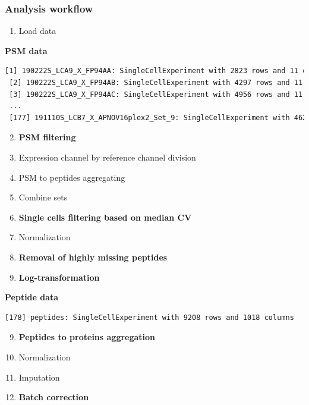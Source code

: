 \documentclass{beamer}
\newcommand{\frametitlesection}[1]{\frametitle{\centering #1 \footnotesize \hspace{0pt plus 1 filll} \insertsection}}
\begin{document}
\begin{frame}[fragile]
    \frametitlesection{Analysis workflow}
    
    \scriptsize
    
    \begin{enumerate}
        \item Load data
    \end{enumerate}
    
    \textbf{PSM data}
    
    \begin{lstlisting}[language = TeX, numbers = none, basicstyle = \ttfamily\@setfontsize{\srcsize}{5pt}{5pt}\color{vdgray}]
 [1] 190222S_LCA9_X_FP94AA: SingleCellExperiment with 2823 rows and 11 columns 
 [2] 190222S_LCA9_X_FP94AB: SingleCellExperiment with 4297 rows and 11 columns 
 [3] 190222S_LCA9_X_FP94AC: SingleCellExperiment with 4956 rows and 11 columns 
 ...
 [177] 191110S_LCB7_X_APNOV16plex2_Set_9: SingleCellExperiment with 4626 rows and 16 columns
    \end{lstlisting}
    
    \pause
    
    \begin{enumerate}
        \setcounter{enumi}{1}
        \item \textbf<4>{PSM filtering}
        \item Expression channel by reference channel division
        \item PSM to peptides aggregating
        \item Combine sets
        \item \textbf<4>{Single cells filtering based on median CV}
        \item Normalization
        \item \textbf<4>{Removal of highly missing peptides}
        \item \textbf<4>{Log-transformation}
    \end{enumerate}
    
    \textbf{Peptide data}
    
    \begin{lstlisting}[language = TeX, numbers = none, basicstyle = \ttfamily\@setfontsize{\srcsize}{5pt}{5pt}\color{vdgray}]
 [178] peptides: SingleCellExperiment with 9208 rows and 1018 columns
    \end{lstlisting}
    
    \pause
    
    \begin{enumerate}
        \setcounter{enumi}{8}
        \item \textbf<4>{Peptides to proteins aggregation}
        \item Normalization
        \item Imputation
        \item \textbf<4>{Batch correction}
    \end{enumerate}
    

\end{frame}
\end{document}
